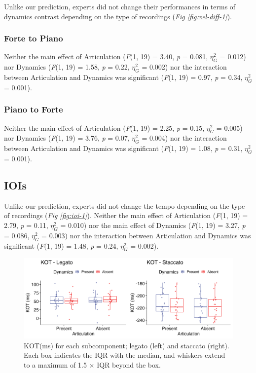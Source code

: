 \documentclass[
  man,floatsintext]{apa6}
\begin{document}
Unlike our prediction, experts did not change their performances in terms of dynamics contrast depending on the type of recordings (\emph{Fig \ref{fig:vel-diff-1}}).

\hypertarget{forte-to-piano}{%
\subsubsection{Forte to Piano}\label{forte-to-piano}}

Neither the main effect of Articulation (\emph{F}(1, 19) = 3.40, \emph{p} = 0.081, \(\eta_G^2\) = 0.012) nor Dynamics (\emph{F}(1, 19) = 1.58, \emph{p} = 0.22, \(\eta_G^2\) = 0.002) nor the interaction between Articulation and Dynamics was significant (\emph{F}(1, 19) = 0.97, \emph{p} = 0.34, \(\eta_G^2\) = 0.001).

\hypertarget{piano-to-forte}{%
\subsubsection{Piano to Forte}\label{piano-to-forte}}

Neither the main effect of Articulation (\emph{F}(1, 19) = 2.25, \emph{p} = 0.15, \(\eta_G^2\) = 0.005) nor Dynamics (\emph{F}(1, 19) = 3.76, \emph{p} = 0.07, \(\eta_G^2\) = 0.004) nor the interaction between Articulation and Dynamics was significant (\emph{F}(1, 19) = 1.08, \emph{p} = 0.31, \(\eta_G^2\) = 0.001).

\hypertarget{iois}{%
\subsection{IOIs}\label{iois}}

Unlike our prediction, experts did not change the tempo depending on the type of recordings (\emph{Fig \ref{fig:ioi-1}}). Neither the main effect of Articulation (\emph{F}(1, 19) = 2.79, \emph{p} = 0.11, \(\eta_G^2\) = 0.010) nor the main effect of Dynamics (\emph{F}(1, 19) = 3.27, \emph{p} = 0.086, \(\eta_G^2\) = 0.003) nor the interaction between Articulation and Dynamics was significant (\emph{F}(1, 19) = 1.48, \emph{p} = 0.24, \(\eta_G^2\) = 0.002).

\begin{figure}
\includegraphics[width=1\linewidth]{manuscript_files/figure-latex/plot-kot-1-1} \caption{\label{fig:kot-1}KOT(ms) for each subcomponent; legato (left) and staccato (right). Each box indicates the IQR with the median, and whiskers extend to a maximum of 1.5 × IQR beyond the box.}\label{fig:plot-kot-1}
\end{figure}
\end{document}
